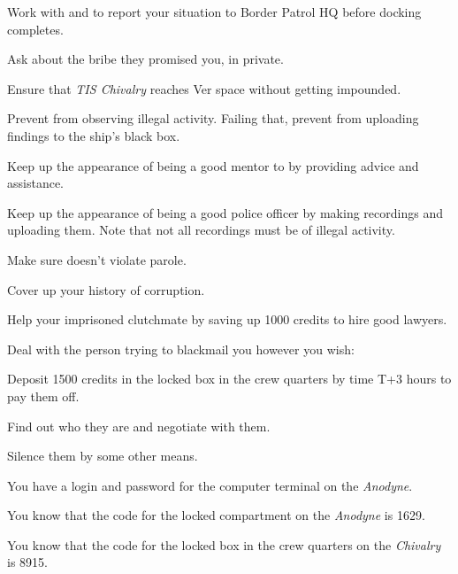 \documentclass[char]{guildcamp4}
\begin{document}
\begin{itemz}[Goals]
	\item Work with \cCgood{} and \cPilot{} to report your situation to Border Patrol HQ before docking completes.
	\item Ask \cVone{} about the bribe they promised you, in private.
	\item Ensure that \emph{TIS Chivalry} reaches Ver space without getting impounded.
	\item Prevent \cCgood{} from observing illegal activity. Failing that, prevent \cCgood{\them} from uploading \cCgood{\their} findings to the ship's black box.
	\item Keep up the appearance of being a good mentor to \cCgood{} by providing advice and assistance.
	\item Keep up the appearance of being a good police officer by making recordings and uploading them. Note that not all recordings must be of illegal activity.
	\item Make sure \cPilot{} doesn't violate  parole. 
	\item Cover up your history of corruption.
	\item Help your imprisoned clutchmate by saving up 1000 credits to hire good lawyers.
	\item Deal with the person trying to blackmail you however you wish:
		\begin{itemz}
		\item Deposit 1500 credits in the locked box in the crew quarters by time T+3 hours to pay them off.
		\item Find out who they are and negotiate with them.
		\item Silence them by some other means.
		\end{itemz}
\end{itemz}

\begin{itemz}[Notes]
	\item You have a login and password for the computer terminal on the \emph{Anodyne}.
	\item You know that the code for the locked compartment on the \emph{Anodyne} is 1629.
	\item You know that the code for the locked box in the crew quarters on the \emph{Chivalry} is 8915.
\end{itemz}

\begin{contacts}
	\contact{\cCgood{}}
	\contact{\cPilot{}}
	\contact{\cVone{}}
\end{contacts}
\end{document}
